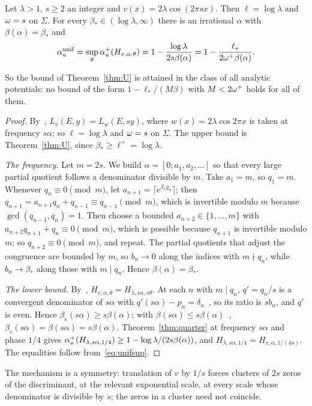 \begin{proposition}\label{prop:NP}
Let $\lambda>1$, $s\ge2$ an integer and $v(x)=2\lambda\cos(2\pi sx)$. Then $\ell=\log\lambda$ and $\omega=s$ on $\Sigma$. For every $\beta_*\in(\log\lambda,\infty)$ there is an irrational $\alpha$ with $\beta(\alpha)=\beta_*$ and
\[
\alpha_u^{\mathrm{unif}}=\sup_\theta\alpha_u^+(H_{v,\alpha,\theta})=1-\frac{\log\lambda}{2s\beta(\alpha)}=1-\frac{\ell_*}{2\omega^+\beta(\alpha)} .
\]
\end{proposition}

So the bound of Theorem~\ref{thm:U} is attained in the class of all analytic potentials: no bound of the form $1-\ell_*/(M\beta)$ with $M<2\omega^+$ holds for all of them.

\begin{proof}
By~\cite[Remark~5.30]{DMuniv}, $L_v(E,y)=L_w(E,sy)$, where $w(x)=2\lambda\cos2\pi x$ is taken at frequency $s\alpha$; so $\ell=\log\lambda$ and $\omega=s$ on $\Sigma$. The upper bound is Theorem~\ref{thm:U}, since $\beta_*\ge\ell^+=\log\lambda$.

\emph{The frequency.} Let $m=2s$. We build $\alpha=[0;a_1,a_2,\dots]$ so that every large partial quotient follows a denominator divisible by $m$. Take $a_1=m$, so $q_1=m$. Whenever $q_n\equiv0\pmod m$, let $a_{n+1}=\lceil e^{\beta_*q_n}\rceil$; then $q_{n+1}=a_{n+1}q_n+q_{n-1}\equiv q_{n-1}\pmod m$, which is invertible modulo $m$ because $\gcd(q_{n-1},q_n)=1$. Then choose a bounded $a_{n+2}\in\{1,\dots,m\}$ with $a_{n+2}q_{n+1}+q_n\equiv0\pmod m$, which is possible because $q_{n+1}$ is invertible modulo $m$; so $q_{n+2}\equiv0\pmod m$, and repeat. The partial quotients that adjust the congruence are bounded by $m$, so $b_n\to0$ along the indices with $m\nmid q_n$, while $b_n\to\beta_*$ along those with $m\mid q_n$. Hence $\beta(\alpha)=\beta_*$.

\emph{The lower bound.} By~\cite[proof of Theorem~5.29]{DMuniv}, $H_{v,\alpha,\theta}=H_{\lambda,s\alpha,s\theta}$. At each $n$ with $m\mid q_n$, $q'=q_n/s$ is a convergent denominator of $s\alpha$ with $q'(s\alpha)-p_n=\delta_n$~\cite[Proposition~5.27]{DMuniv}, so its ratio is $sb_n$, and $q'$ is even. Hence $\beta_e(s\alpha)\ge s\beta(\alpha)$; with $\beta(s\alpha)\le s\beta(\alpha)$~\cite[Lemma~5.28]{DMuniv}, $\beta_e(s\alpha)=\beta(s\alpha)=s\beta(\alpha)$. Theorem~\ref{thm:quarter} at frequency $s\alpha$ and phase $1/4$ gives $\alpha_u^+(H_{\lambda,s\alpha,1/4})\ge1-\log\lambda/(2s\beta(\alpha))$, and $H_{\lambda,s\alpha,1/4}=H_{v,\alpha,1/(4s)}$. The equalities follow from~\eqref{eq:unifsup}.
\end{proof}

The mechanism is a symmetry: translation of $v$ by $1/s$ forces clusters of $2s$ zeros of the discriminant, at the relevant exponential scale, at every scale whose denominator is divisible by $s$; the zeros in a cluster need not coincide.
